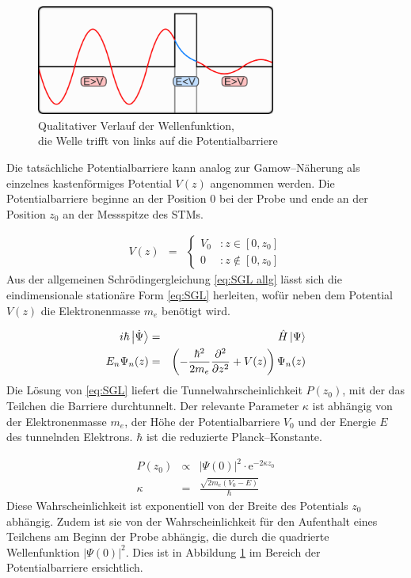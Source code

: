 \documentclass[12pt,a4paper]{scrartcl}
\numberwithin{equation}{section} %
\begin{document}
\begin{figure}[ht]
	\centering
	\includegraphics[width=0.7\textwidth]{../media/B2.5/800px-TunnelEffektKling1.png}
	\caption{Qualitativer Verlauf der Wellenfunktion, \\die Welle trifft von links auf die Potentialbarriere
		\cite{WikipediaTunneleffekt}\\}
	\label{abb:tunneleffekt}
\end{figure}

Die tatsächliche Potentialbarriere kann analog zur Gamow--Näherung als einzelnes kastenförmiges Potential $V(z)$ angenommen werden. Die Potentialbarriere beginne an der Position $0$ bei der Probe und ende an der Position $z_0$ an der Messspitze des STMs.

\begin{eqnarray}
	V(z) &=&
	\begin{cases}
		V_0 &: z \in [0, z_0] \\
		0 &: z \notin [0, z_0]
	\end{cases}
\end{eqnarray}
Aus der allgemeinen Schrödingergleichung \eqref{eq:SGL allg} lässt sich die eindimensionale stationäre Form \eqref{eq:SGL} herleiten, wofür neben dem Potential $V(z)$ die Elektronenmasse $m_e$ benötigt wird.

\begin{eqnarray}
	i\hbar \ket{\dot{\Psi}} &=& \hat H\ket{\Psi} \label{eq:SGL allg} \\
	E_n\Psi_n(z) &=&
		\left(
			-\frac{\hbar^2}{2m_e} \frac{\partial^2}{\partial z^2} + V(z)
		\right)\Psi_n(z)
		\label{eq:SGL}
\end{eqnarray}
Die Lösung von \eqref{eq:SGL} liefert die Tunnelwahrscheinlichkeit $P(z_0)$, mit der das Teilchen die Barriere durchtunnelt. Der relevante Parameter $\kappa$ ist abhängig von der Elektronenmasse $m_e$, der Höhe der Potentialbarriere $V_0$ und der Energie $E$ des tunnelnden Elektrons. $\hbar$ ist die reduzierte Planck--Konstante.

\begin{eqnarray}
	P(z_0) &\propto& |\Psi(0)|^2 \cdot \mathrm e^{-2\kappa z_0} \\
	\kappa &=& \frac{\sqrt{2m_e(V_0 - E)}}{\hbar} \label{eq:Tunnelwkt Kappa}
\end{eqnarray}
Diese Wahrscheinlichkeit ist exponentiell von der Breite des Potentials $z_0$ abhängig. Zudem ist sie von der Wahrscheinlichkeit für den Aufenthalt eines Teilchens am Beginn der Probe abhängig, die durch die quadrierte Wellenfunktion $|\Psi(0)|^2$. Dies ist in Abbildung \ref{abb:tunneleffekt} im Bereich der Potentialbarriere ersichtlich.
\end{document}
